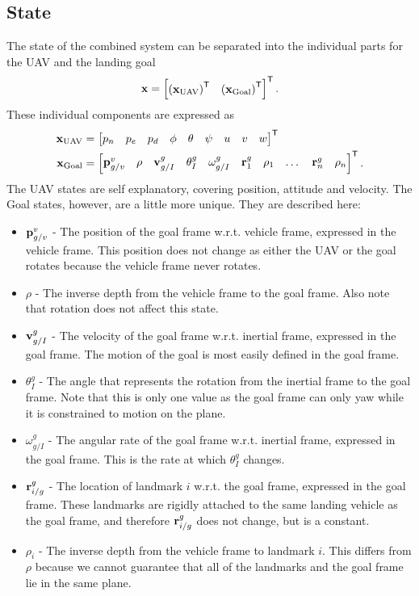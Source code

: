 \documentclass[a4paper]{article}
\begin{document}
\subsection{State}
The state of the combined system can be separated into the individual parts for
the UAV and the landing goal
\begin{equation}
  \boldsymbol{\mathrm{x}} =
  \begin{bmatrix}
    \left(\boldsymbol{\mathrm{x}}_{\text{UAV}}\right)^{\mathsf{T}} & \left(\boldsymbol{\mathrm{x}}_{\text{Goal}}\right)^{\mathsf{T}}
  \end{bmatrix}^{\mathsf{T}}.
\end{equation}
These individual components are expressed as
\begin{align}
  \boldsymbol{\mathrm{x}}_{\text{UAV}} &=
  \begin{bmatrix}
    p_n & p_e & p_d &
    \phi & \theta & \psi &
    u & v & w
  \end{bmatrix}^{\mathsf{T}} \\
  \boldsymbol{\mathrm{x}}_{\text{Goal}} & =
    \begin{bmatrix}
      \boldsymbol{\mathrm{p}}_{g/v}^{v} & \rho & \boldsymbol{\mathrm{v}}_{g/I}^{g} & \theta_{I}^{g} &
      \omega_{g/I}^{g} &
      \boldsymbol{\mathrm{r}}_{1}^{g} & \rho_{1} & \dots & \boldsymbol{\mathrm{r}}_{n}^{g} & \rho_{n}
    \end{bmatrix}^{\mathsf{T}}.
\end{align}
The UAV states are self explanatory, covering position, attitude and velocity.
The Goal states, however, are a little more unique. They are described here:
\begin{itemize}
  \item $\boldsymbol{\mathrm{p}}_{g/v}^{v}$ - The position of the goal frame w.r.t. vehicle
    frame, expressed in the vehicle frame. This position does not change as
    either the UAV or the goal rotates because the vehicle frame never rotates.
  \item $\rho$ - The inverse depth from the vehicle frame to the goal frame.
    Also note that rotation does not affect this state.
  \item $\boldsymbol{\mathrm{v}}_{g/I}^{g}$ - The velocity of the goal frame w.r.t. inertial
    frame, expressed in the goal frame. The motion of the goal is most easily
    defined in the goal frame.
  \item $\theta_I^g$ - The angle that represents the rotation from the inertial
    frame to the goal frame. Note that this is only one value as the goal frame
    can only yaw while it is constrained to motion on the plane.
  \item $\omega_{g/I}^g$ - The angular rate of the goal frame w.r.t. inertial
    frame, expressed in the goal frame. This is the rate at which $\theta_I^g$
    changes.
  \item $\boldsymbol{\mathrm{r}}_{i/g}^g$ - The location of landmark $i$ w.r.t. the goal frame,
    expressed in the goal frame. These landmarks are rigidly attached to the
    same landing vehicle as the goal frame, and therefore $\boldsymbol{\mathrm{r}}_{i/g}^g$
    does not change, but is a constant.
  \item $\rho_i$ - The inverse depth from the vehicle frame to landmark $i$.
    This differs from $\rho$ because we cannot guarantee that all of the
    landmarks and the goal frame lie in the same plane.
\end{itemize}
\end{document}
